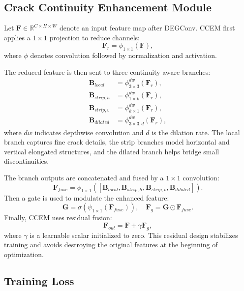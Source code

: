 \documentclass[preprint,12pt]{elsarticle}
\begin{document}
\subsection{Crack Continuity Enhancement Module}

Let $\mathbf{F}\in\mathbb{R}^{C\times H\times W}$ denote an input feature map after DEGConv. CCEM first applies a $1\times1$ projection to reduce channels:
\begin{equation}
\mathbf{F}_{r} = \phi_{1\times1}(\mathbf{F}),
\end{equation}
where $\phi$ denotes convolution followed by normalization and activation.

The reduced feature is then sent to three continuity-aware branches:
\begin{align}
\mathbf{B}_{local} &= \phi_{3\times3}^{dw}(\mathbf{F}_{r}), \\
\mathbf{B}_{strip,h} &= \phi_{1\times k}^{dw}(\mathbf{F}_{r}), \\
\mathbf{B}_{strip,v} &= \phi_{k\times 1}^{dw}(\mathbf{F}_{r}), \\
\mathbf{B}_{dilated} &= \phi_{3\times3,d}^{dw}(\mathbf{F}_{r}),
\end{align}
where $dw$ indicates depthwise convolution and $d$ is the dilation rate. The local branch captures fine crack details, the strip branches model horizontal and vertical elongated structures, and the dilated branch helps bridge small discontinuities.

The branch outputs are concatenated and fused by a $1\times1$ convolution:
\begin{equation}
\mathbf{F}_{fuse} = \phi_{1\times1}([\mathbf{B}_{local}, \mathbf{B}_{strip,h}, \mathbf{B}_{strip,v}, \mathbf{B}_{dilated}]).
\end{equation}
Then a gate is used to modulate the enhanced feature:
\begin{equation}
\mathbf{G} = \sigma(\psi_{1\times1}(\mathbf{F}_{fuse})),
\quad
\mathbf{F}_{g} = \mathbf{G}\odot\mathbf{F}_{fuse}.
\end{equation}
Finally, CCEM uses residual fusion:
\begin{equation}
\mathbf{F}_{out} = \mathbf{F} + \gamma\mathbf{F}_{g},
\end{equation}
where $\gamma$ is a learnable scalar initialized to zero. This residual design stabilizes training and avoids destroying the original features at the beginning of optimization.

\subsection{Training Loss}
\end{document}

